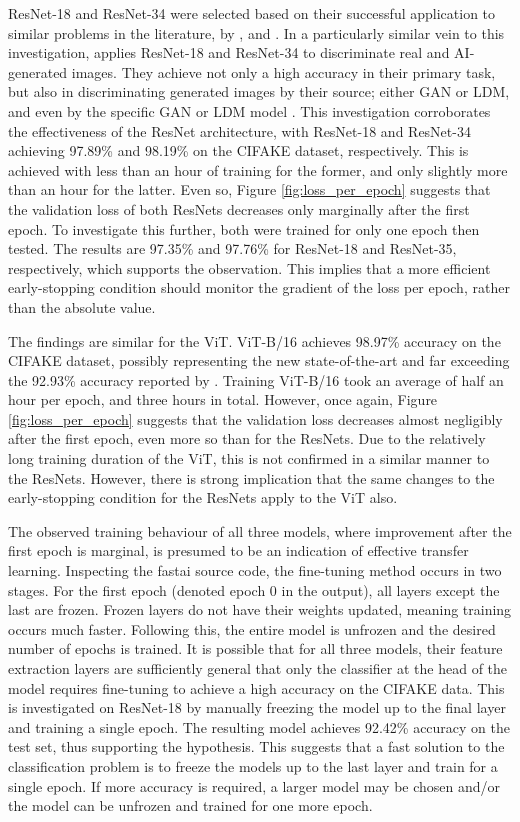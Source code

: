 ResNet-18 and ResNet-34 were selected based on their successful application to similar problems in the literature, by \cite{amerini_2019}, \cite{guarnera_2023} and \cite{saikia_2022}. In a particularly similar vein to this investigation, \cite{guarnera_2023} applies ResNet-18 and ResNet-34 to discriminate real and AI-generated images. They achieve not only a high accuracy in their primary task, but also in discriminating generated images by their source; either GAN or LDM, and even by the specific GAN or LDM model \cite{guarnera_2023}. This investigation corroborates the effectiveness of the ResNet architecture, with ResNet-18 and ResNet-34 achieving 97.89\% and 98.19\% on the CIFAKE dataset, respectively. This is achieved with less than an hour of training for the former, and only slightly more than an hour for the latter. Even so, Figure \ref{fig:loss_per_epoch} suggests that the validation loss of both ResNets decreases only marginally after the first epoch. To investigate this further, both were trained for only one epoch then tested. The results are 97.35\% and 97.76\% for ResNet-18 and ResNet-35, respectively, which supports the observation. This implies that a more efficient early-stopping condition should monitor the gradient of the loss per epoch, rather than the absolute value.

The findings are similar for the ViT. ViT-B/16 achieves 98.97\% accuracy on the CIFAKE dataset, possibly representing the new state-of-the-art and far exceeding the 92.93\% accuracy reported by \cite{bird_2023}. Training ViT-B/16 took an average of half an hour per epoch, and three hours in total. However, once again, Figure \ref{fig:loss_per_epoch} suggests that the validation loss decreases almost negligibly after the first epoch, even more so than for the ResNets. Due to the relatively long training duration of the ViT, this is not confirmed in a similar manner to the ResNets. However, there is strong implication that the same changes to the early-stopping condition for the ResNets apply to the ViT also.

The observed training behaviour of all three models, where improvement after the first epoch is marginal, is presumed to be an indication of effective transfer learning. Inspecting the fastai source code, the fine-tuning method occurs in two stages. For the first epoch (denoted epoch 0 in the output), all layers except the last are frozen. Frozen layers do not have their weights updated, meaning training occurs much faster. Following this, the entire model is unfrozen and the desired number of epochs is trained. It is possible that for all three models, their feature extraction layers are sufficiently general that only the classifier at the head of the model requires fine-tuning to achieve a high accuracy on the CIFAKE data. This is investigated on ResNet-18 by manually freezing the model up to the final layer and training a single epoch. The resulting model achieves 92.42\% accuracy on the test set, thus supporting the hypothesis. This suggests that a fast solution to the classification problem is to freeze the models up to the last layer and train for a single epoch. If more accuracy is required, a larger model may be chosen and/or the model can be unfrozen and trained for one more epoch.

